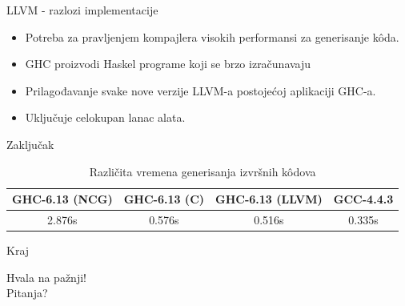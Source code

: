 \documentclass{beamer}
\begin{document}
\begin{frame}[fragile]{LLVM - razlozi implementacije}
	\begin{itemize}
		\item Potreba za pravljenjem kompajlera visokih performansi za generisanje k\^{o}da.
		\item GHC proizvodi Haskel programe koji se brzo izračunavaju
		\item Prilagođavanje svake nove verzije LLVM-a postojećoj aplikaciji GHC-a. 
		\item Uključuje celokupan lanac alata. 
	\end{itemize}

\end{frame}

\begin{frame}[fragile]{Zaključak}
	\begin{table}[h!]
		\begin{center}
			\caption{Različita vremena generisanja izvršnih k\^{o}dova}
			\begin{tabular}{||c|c|c|c||} \hline
				GHC-6.13 (NCG) & GHC-6.13 (C) & GHC-6.13 (LLVM) & GCC-4.4.3 \\ \hline
				2.876s & 0.576s & 0.516s & 0.335s \\ \hline
			\end{tabular}
			\label{tab:vremena}
		\end{center}
	\end{table}
\end{frame}

\begin{frame}[fragile]{Kraj}
	
	\begin{center}
		Hvala na pažnji! \\
		\vspace{0.5cm}
		Pitanja?
	\end{center}
\end{frame}
\end{document}
